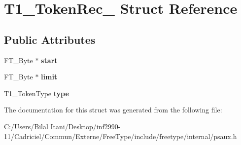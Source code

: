 \hypertarget{struct_t1___token_rec__}{}\section{T1\+\_\+\+Token\+Rec\+\_\+ Struct Reference}
\label{struct_t1___token_rec__}
\subsection*{Public Attributes}
\begin{DoxyCompactItemize}
\item 
F\+T\+\_\+\+Byte $\ast$ {\bfseries start}\hypertarget{struct_t1___token_rec___a1b365e2910220eabf05f925f45bc98d6}{}\label{struct_t1___token_rec___a1b365e2910220eabf05f925f45bc98d6}

\item 
F\+T\+\_\+\+Byte $\ast$ {\bfseries limit}\hypertarget{struct_t1___token_rec___aacd035f0dfbc47b7e1c7eefbe2c2080c}{}\label{struct_t1___token_rec___aacd035f0dfbc47b7e1c7eefbe2c2080c}

\item 
T1\+\_\+\+Token\+Type {\bfseries type}\hypertarget{struct_t1___token_rec___a88b3b889e74609be1827ead4093a2d52}{}\label{struct_t1___token_rec___a88b3b889e74609be1827ead4093a2d52}

\end{DoxyCompactItemize}


The documentation for this struct was generated from the following file\+:\begin{DoxyCompactItemize}
\item 
C\+:/\+Users/\+Bilal Itani/\+Desktop/inf2990-\/11/\+Cadriciel/\+Commun/\+Externe/\+Free\+Type/include/freetype/internal/psaux.\+h\end{DoxyCompactItemize}

